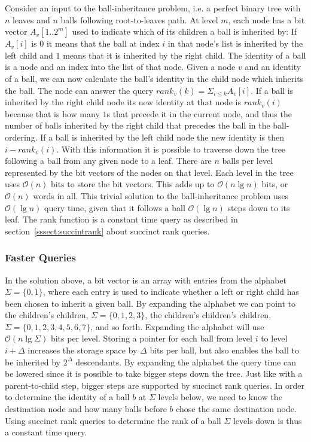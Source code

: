 Consider an input to the ball-inheritance problem, i.e. a perfect binary tree with $n$ leaves and $n$ balls following root-to-leaves path. At level $m$, each node has a bit vector $A_v[1..2^m]$ used to indicate which of its children a ball is inherited by: If $A_v[i]$ is $0$ it means that the ball at index $i$ in that node's list is inherited by the left child and $1$ means that it is inherited by the right child. The identity of a ball is a node and an index into the list of that node. Given a node $v$ and an identity of a ball, we can now calculate the ball's identity in the child node which inherits the ball. The node can answer the query $rank_v(k) = \Sigma_{i \leq k} A_v[i]$. If a ball is inherited by the right child node its new identity at that node is $rank_v(i)$ because that is how many $1$s that precede it in the current node, and thus the number of balls inherited by the right child that precedes the ball in the ball-ordering. If a ball is inherited by the left child node the new identity is then $i-rank_v(i)$. With this information it is possible to traverse down the tree following a ball from any given node to a leaf. There are $n$ balls per level represented by the bit vectors of the nodes on that level. Each level in the tree uses $\mathcal{O}(n)$ bits to store the bit vectors. This adds up to $\mathcal{O}(n \lg n)$ bits, or $\mathcal{O}(n)$ words in all. This trivial solution to the ball-inheritance problem uses $\mathcal{O}(\lg n)$ query time, given that it follows a ball $\mathcal{O}(\lg n)$ steps down to its leaf. The rank function is a constant time query as described in section~\ref{sssect:succintrank} about succinct rank queries.


\subsubsection{Faster Queries}
\label{ssection:fasterqueries}

In the solution above, a bit vector is an array with entries from the alphabet $\Sigma = \{0,1\}$, where each entry is used to indicate whether a left or right child has been chosen to inherit a given ball. By expanding the alphabet we can point to the children's children, $\Sigma = \{0,1,2,3\}$, the children's children's children, $\Sigma = \{0,1,2,3,4,5,6,7\}$, and so forth. Expanding the alphabet will use $\mathcal{O}(n \lg \Sigma)$ bits per level. Storing a pointer for each ball from level $i$ to level $i+\Delta$ increases the storage space by $\Delta$ bits per ball, but also enables the ball to be inherited by $2^\Delta$ descendants. By expanding the alphabet the query time can be lowered since it is possible to take bigger steps down the tree. Just like with a parent-to-child step, bigger steps are supported by succinct rank queries. In order to determine the identity of a ball $b$ at $\Sigma$ levels below, we need to know the destination node and how many balls before $b$ chose the same destination node. Using succinct rank queries to determine the rank of a ball $\Sigma$ levels down is thus a constant time query.

